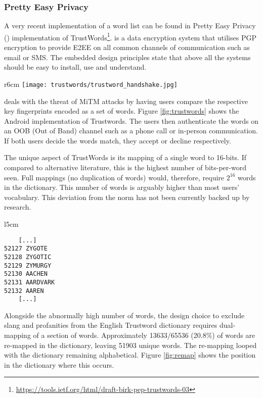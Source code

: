 \newpage
\subsubsection*{Pretty Easy Privacy}
\label{sec:pep}
A very recent implementation of a word list can be found in Pretty Easy Privacy (\pep) implementation of TrustWords\footnote{\url{https://tools.ietf.org/html/draft-birk-pep-trustwords-03}}. \pep is a data encryption system that utilises PGP encryption to provide E2EE on all common channels of communication such as email or SMS. The embedded design principles state that above all the systems should be easy to install, use and understand.

\begin{wrapfigure}{r}{6cm}
    \centering
    \texttt{[image: trustwords/trustword\_handshake.jpg]}
    \caption{Trustword fingerprint verification}
    \label{fig:trustwords}
\end{wrapfigure}

\pep deals with the threat of MiTM attacks by having users compare the respective key fingerprints encoded as a set of words. Figure \ref{fig:trustwords} shows the \pep Android implementation of Trustwords. The users then authenticate the words on an OOB (Out of Band) channel such as a phone call or in-person communication. If both users decide the words match, they accept or decline respectively.

The unique aspect of TrustWords is its mapping of a single word to 16-bits. If compared to alternative literature, this is the highest number of bits-per-word seen. Full mappings (no duplication of words) would, therefore, require $2^{16}$ words in the dictionary. This number of words is arguably higher than most users' vocabulary. This deviation from the norm has not been currently backed up by research. 

\begin{wrapfigure}[11]{l}{5cm}
    \centering
    \begin{BVerbatim}
    [...]
52127 ZYGOTE
52128 ZYGOTIC
52129 ZYMURGY
52130 AACHEN
52131 AARDVARK
52132 AAREN
    [...]
    \end{BVerbatim}
    \caption{Re-mapping position}
    \label{fig:remap}
\end{wrapfigure}

Alongside the abnormally high number of words, the design choice to exclude slang and profanities from the English Trustword dictionary requires dual-mapping of a section of words. Approximately 13633/65536 (20.8\%) of words are re-mapped in the dictionary, leaving 51903 unique words. The re-mapping looped with the dictionary remaining alphabetical. Figure \ref{fig:remap} shows the position in the dictionary where this occurs.

